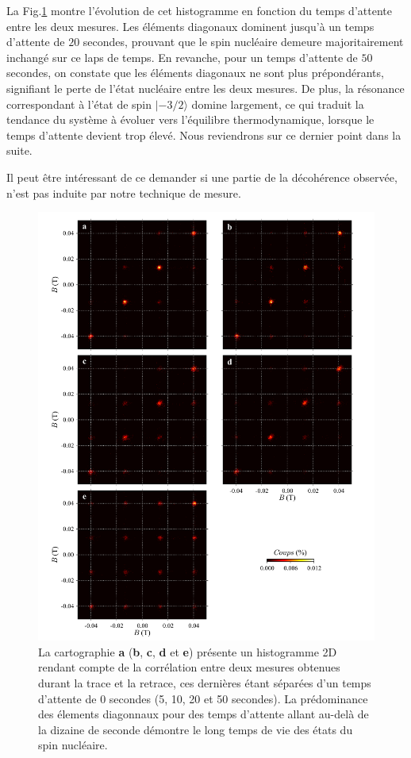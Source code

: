 La Fig.\ref{evolution_temps} montre l'évolution de cet histogramme en fonction du temps d'attente entre les deux mesures. Les éléments diagonaux dominent jusqu'à un temps d'attente de $20$ secondes, prouvant que le spin nucléaire demeure majoritairement inchangé sur ce laps de temps. En revanche, pour un temps d'attente de $50$ secondes, on constate que les éléments diagonaux ne sont plus prépondérants, signifiant le perte de l'état nucléaire entre les deux mesures. De plus, la résonance correspondant à l'état de spin $|-3/2 \rangle$ domine largement, ce qui traduit la tendance du système à évoluer vers l'équilibre thermodynamique, lorsque le temps d'attente devient trop élevé. Nous reviendrons sur ce dernier point dans la suite.

Il peut être intéressant de ce demander si une partie de la décohérence observée, n'est pas induite par notre technique de mesure.

\begin{figure}[h!]
\includegraphics[scale=0.45]{Resultats/HistTime/HistTime.pdf} 
\caption{La cartographie \textbf{a} (\textbf{b}, \textbf{c}, \textbf{d} et \textbf{e}) présente un histogramme 2D rendant compte de la corrélation entre deux mesures obtenues durant la trace et la retrace, ces dernières étant séparées d'un temps d'attente de 0 secondes (5, 10, 20 et 50 secondes). La prédominance des élements diagonnaux pour des temps d'attente allant au-delà de la dizaine de seconde démontre le long temps de vie des états du spin nucléaire.}
\label{evolution_temps}
\end{figure}


